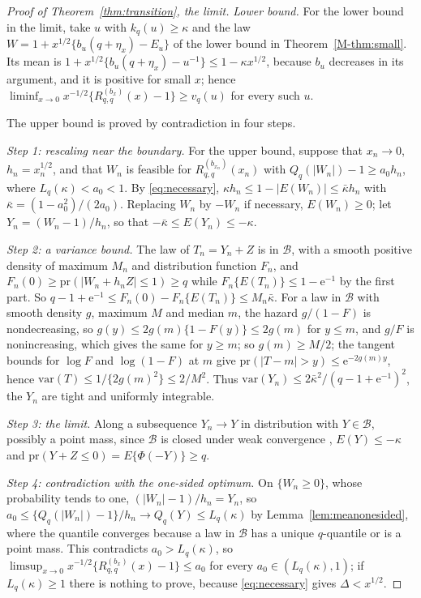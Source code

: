 \documentclass[11pt]{article}
\renewcommand{\_}{\usc\allowbreak}
\newcommand{\pr}{\mathrm{pr}}
\newcommand{\var}{\mathrm{var}}
\begin{document}
\begin{proof}[Proof of Theorem~\ref{thm:transition}, the limit]
\emph{Lower bound.} For the lower bound in the limit, take $u$ with $k_q(u) \ge \kappa$ and the law $W = 1 + x^{1/2}\{b_u(q + \eta_x) - E_u\}$ of the lower bound in Theorem~\ref{M-thm:small}. Its mean is $1 + x^{1/2}\{b_u(q + \eta_x) - u^{-1}\} \le 1 - \kappa x^{1/2}$, because $b_u$ decreases in its argument, and it is positive for small $x$; hence $\liminf_{x\to0} x^{-1/2}\{R^{(b_x)}_{q,q}(x) - 1\} \ge v_q(u)$ for every such $u$.

The upper bound is proved by contradiction in four steps.

\emph{Step 1: rescaling near the boundary.} For the upper bound, suppose that $x_n \to 0$, $h_n = x_n^{1/2}$, and that $W_n$ is feasible for $R^{(b_{x_n})}_{q,q}(x_n)$ with $Q_q(|W_n|) - 1 \ge a_0 h_n$, where $L_q(\kappa) < a_0 < 1$. By \eqref{eq:necessary}, $\kappa h_n \le 1 - |E(W_n)| \le \bar\kappa h_n$ with $\bar\kappa = (1 - a_0^2)/(2a_0)$. Replacing $W_n$ by $-W_n$ if necessary, $E(W_n) \ge 0$; let $Y_n = (W_n - 1)/h_n$, so that $-\bar\kappa \le E(Y_n) \le -\kappa$.

\emph{Step 2: a variance bound.} The law of $T_n = Y_n + Z$ is in $\mathcal B$, with a smooth positive density of maximum $M_n$ and distribution function $F_n$, and $F_n(0) \ge \pr(|W_n + h_nZ| \le 1) \ge q$ while $F_n\{E(T_n)\} \le 1 - \mathrm{e}^{-1}$ by the first part. So $q - 1 + \mathrm{e}^{-1} \le F_n(0) - F_n\{E(T_n)\} \le M_n \bar\kappa$. For a law in $\mathcal B$ with smooth density $g$, maximum $M$ and median $m$, the hazard $g/(1 - F)$ is nondecreasing, so $g(y) \le 2g(m)\{1 - F(y)\} \le 2g(m)$ for $y \le m$, and $g/F$ is nonincreasing, which gives the same for $y \ge m$; so $g(m) \ge M/2$; the tangent bounds for $\log F$ and $\log(1-F)$ at $m$ give $\pr(|T - m| > y) \le \mathrm{e}^{-2g(m)y}$, hence $\var(T) \le 1/\{2g(m)^2\} \le 2/M^2$. Thus $\var(Y_n) \le 2\bar\kappa^2/(q - 1 + \mathrm{e}^{-1})^2$, the $Y_n$ are tight and uniformly integrable.

\emph{Step 3: the limit.} Along a subsequence $Y_n \to Y$ in distribution with $Y \in \mathcal B$, possibly a point mass, since $\mathcal B$ is closed under weak convergence \citep{saumard2019}, $E(Y) \le -\kappa$ and $\pr(Y + Z \le 0) = E\{\Phi(-Y)\} \ge q$.

\emph{Step 4: contradiction with the one-sided optimum.} On $\{W_n \ge 0\}$, whose probability tends to one, $(|W_n| - 1)/h_n = Y_n$, so $a_0 \le \{Q_q(|W_n|) - 1\}/h_n \to Q_q(Y) \le L_q(\kappa)$ by Lemma~\ref{lem:meanonesided}, where the quantile converges because a law in $\mathcal B$ has a unique $q$-quantile or is a point mass. This contradicts $a_0 > L_q(\kappa)$, so $\limsup_{x\to0} x^{-1/2}\{R^{(b_x)}_{q,q}(x) - 1\} \le a_0$ for every $a_0 \in (L_q(\kappa), 1)$; if $L_q(\kappa) \ge 1$ there is nothing to prove, because \eqref{eq:necessary} gives $\Delta < x^{1/2}$.
\end{proof}
\end{document}
